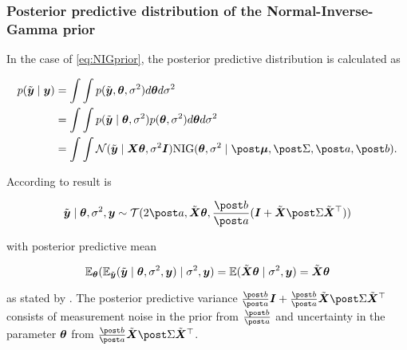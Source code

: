 \subsubsection*{Posterior predictive distribution of the Normal-Inverse-Gamma prior}

In the case of \eqref{eq:NIGprior}, the posterior predictive distribution is calculated as 

\begin{equation*}
    \begin{aligned}
        p(\ty \mid \by) 
        &= \int \int p(\ty, \btheta, \ssd) d \btheta d \ssd \\
        &= \int \int p(\ty \mid \btheta, \ssd) p(\btheta, \ssd) d \btheta d \ssd \\
        &= \int \int \Ncal(\ty \mid \bX \btheta, \ssd \bI) \text{NIG}(\btheta, \ssd \mid \mupo, \Sdpo, \apo, \bpo).
    \end{aligned}
\end{equation*}

According to \citet{kevin_p_murphy_probabilistic_2023} result is

\begin{equation*}
    \ty \mid \btheta, \ssd, \by \sim \Tcal(2 \apo, \tX \btheta, \frac{\bpo}{\apo} (\bI + \tX \Sdpo \tX^\top))
\end{equation*}

with posterior predictive mean

\begin{equation*}
    \mathbb{E}_{\bm{\theta}} ( \mathbb{E}_{\tilde{\bm{y}}} (\tilde{\bm{y}} \mid \bm{\theta}, \sigma^2, \bm{y}) \mid \sigma^2, \bm{y} ) = \mathbb{E} (\tilde{\bm{X}} \bm{\theta} \mid \sigma^2 , \bm{y}) = \tilde{\bm{X}} \bm{\theta}
\end{equation*}

as stated by \citet{gelman_bayesian_2013}. The posterior predictive variance $\frac{\bpo}{\apo} \bI + \frac{\bpo}{\apo} \tX \Sdpo \tX^\top$ consists of measurement noise in the prior from $\frac{\bpo}{\apo}$ and uncertainty in the parameter $\bm{\theta}$ from $\frac{\bpo}{\apo} \tX \Sdpo \tX^\top$. 